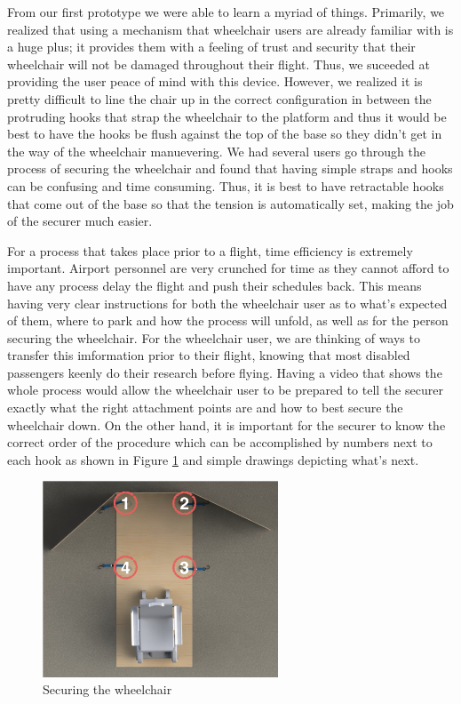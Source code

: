 From our first prototype we were able to learn a myriad of things. Primarily, we realized that using a mechanism that wheelchair users are already familiar with is a huge plus; it provides them with a feeling of trust and security that their wheelchair will not be damaged throughout their flight. Thus, we suceeded at providing the user peace of mind with this device. However, we realized it is pretty difficult to line the chair up in the correct configuration in between the protruding hooks that strap the wheelchair to the platform and thus it would be best to have the hooks be flush against the top of the base so they didn't get in the way of the wheelchair manuevering.
We had several users go through the process of securing the wheelchair and found that having simple straps and hooks can be confusing and time consuming. Thus, it is best to have retractable hooks that come out of the base so that the tension is automatically set, making the job of the securer much easier. 

For a process that takes place prior to a flight, time efficiency is extremely important. Airport personnel are very crunched for time as they cannot afford to have any process delay the flight and push their schedules back. This means having very clear instructions for both the wheelchair user as to what's expected of them, where to park and how the process will unfold, as well as for the person securing the wheelchair. For the wheelchair user, we are thinking of ways to transfer this imformation prior to their flight, knowing that most disabled passengers keenly do their research before flying. Having a video that shows the whole process would allow the wheelchair user to be prepared to tell the securer exactly what the right attachment points are and how to best secure the wheelchair down. On the other hand, it is important for the securer to know the correct order of the procedure which can be accomplished by numbers next to each hook as shown in Figure \ref{fig:instructionsstorage.png} and simple drawings depicting what's next. 

\begin{figure}[h]
  \centering
     \includegraphics[width=7cm]{images/instructionsstorage.png}
   \caption{Securing the wheelchair}
  \label{fig:instructionsstorage.png}
\end{figure}

